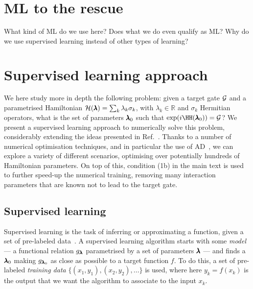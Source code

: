 \section{ML to the rescue}

What kind of ML do we use here? Does what we do even qualify as ML? Why do we use supervised learning instead of other types of learning?


\section{Supervised learning approach}
\label{sec:supervised_learning_approach}
We here study more in depth the following problem: given a target gate $\mathcal{G}$ and a parametrised Hamiltonian ${\mathcal H(\pmb{\lambda}) = \sum_k \lambda_k \sigma_k}$, with $\lambda_k\in\mathbb R$ and $\sigma_k$ Hermitian operators, what is the set of parameters $\pmb{\lambda}_0$ such that $\exponential(i\HH(\bs\lambda_0)) = \calG$?
We present a supervised learning approach to numerically solve this problem, considerably extending the ideas presented in Ref.~\cite{banchi2016quantum}.
Thanks to a number of numerical optimisation techniques, and in particular the use of \ac{AD}~\cite{baydin2015automatic,bartholomewbiggs2000automatic,wengert1964a,bischof2008advances}, we can explore a variety of different scenarios, optimising over potentially hundreds of Hamiltonian parameters.
On top of this, condition (1b) in the main text is used to further speed-up the numerical training, removing many interaction parameters that are known not to lead to the target gate.

\subsection{Supervised learning}
\label{subsec:supervised_learning}

Supervised learning is the task of inferring or approximating a function, given a set of pre-labeled data~\cite{bishop2006pattern,mohri2012foundations}.
A supervised learning algorithm starts with some \emph{model} --- a functional relation $g_{\pmb{\lambda}}$ parametrised by a set of parameters $\pmb{\lambda}$ --- and finds a $\pmb{\lambda}_0$ making $g_{\pmb{\lambda}_0}$ as close as possible to a target function $f$.
To do this, a set of pre-labeled \emph{training data} $\{ (x_1, y_1), (x_2,y_2), ...\}$ is used,
where here $y_k=f(x_k)$ is the output that we want the algorithm to associate to the input $x_k$.

